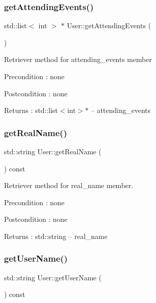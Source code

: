 \subsubsection{\texorpdfstring{get\+Attending\+Events()}{getAttendingEvents()}}
{\footnotesize\ttfamily std\+::list$<$ int $>$ $\ast$ User\+::get\+Attending\+Events (\begin{DoxyParamCaption}{ }\end{DoxyParamCaption})}

Retriever method for attending\+\_\+events member \begin{DoxyPrecond}{Precondition}
\+: none 
\end{DoxyPrecond}
\begin{DoxyPostcond}{Postcondition}
\+: none 
\end{DoxyPostcond}
\begin{DoxyReturn}{Returns}
\+: std\+::list$<$int$>$$\ast$ -- attending\+\_\+events 
\end{DoxyReturn}
\mbox{\label{class_user_a708784a199b60567f59b51d5401167d3}} 
\subsubsection{\texorpdfstring{get\+Real\+Name()}{getRealName()}}
{\footnotesize\ttfamily std\+::string User\+::get\+Real\+Name (\begin{DoxyParamCaption}{ }\end{DoxyParamCaption}) const}

Retriever method for real\+\_\+name member. \begin{DoxyPrecond}{Precondition}
\+: none 
\end{DoxyPrecond}
\begin{DoxyPostcond}{Postcondition}
\+: none 
\end{DoxyPostcond}
\begin{DoxyReturn}{Returns}
\+: std\+::string -- real\+\_\+name 
\end{DoxyReturn}
\mbox{\label{class_user_a7eff012d6182f6829329620d8e21b124}} 
\subsubsection{\texorpdfstring{get\+User\+Name()}{getUserName()}}
{\footnotesize\ttfamily std\+::string User\+::get\+User\+Name (\begin{DoxyParamCaption}{ }\end{DoxyParamCaption}) const}

